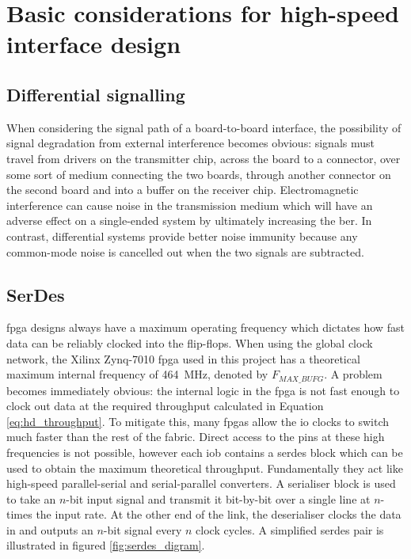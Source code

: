 
\section{Basic considerations for high-speed interface design}

\subsection{Differential signalling}

When considering the signal path of a board-to-board interface, the possibility of signal degradation from external interference becomes obvious: signals must travel from drivers on the transmitter chip, across the board to a connector, over some sort of medium connecting the two boards, through another connector on the second board and into a buffer on the receiver chip. Electromagnetic interference can cause noise in the transmission medium which will have an adverse effect on a single-ended system by ultimately increasing the \gls{ber}. In contrast, differential systems provide better noise immunity because any common-mode noise is cancelled out when the two signals are subtracted.

\subsection{SerDes}
\gls{fpga} designs always have a maximum operating frequency which dictates how fast data can be reliably clocked into the flip-flops. When using the global clock network, the Xilinx Zynq-7010 \gls{fpga} used in this project has a theoretical maximum internal frequency of \SI{464}{\mega\hertz}, denoted by \(F_{MAX\_BUFG}\)\cite{xilinx:ds187}. A problem becomes immediately obvious: the internal logic in the \gls{fpga} is not fast enough to clock out data at the required throughput calculated in Equation \ref{eq:hd_throughput}. To mitigate this, many \glspl{fpga} allow the \gls{io} clocks to switch much faster than the rest of the fabric. Direct access to the pins at these high frequencies is not possible, however each \gls{iob} contains a \gls{serdes} block which can be used to obtain the maximum theoretical throughput. Fundamentally they act like high-speed parallel-serial and serial-parallel converters. A serialiser block is used to take an \(n\)-bit input signal and transmit it bit-by-bit over a single line at \(n\)-times the input rate. At the other end of the link, the deserialiser clocks the data in and outputs an \(n\)-bit signal every \(n\) clock cycles. A simplified \gls{serdes} pair is illustrated in figured \ref{fig:serdes_digram}.


